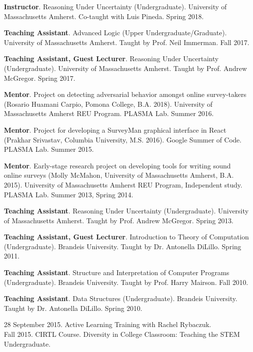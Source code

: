 \documentclass[10pt]{article}
\newcommand{\cvsec}[2]{
    \begin{tcolorbox}[width=\textwidth, breakable, title={#1}]
        #2
    \end{tcolorbox}
    \vspace{10pt}
}
\newcommand{\teaching}[6]{
  \parbox{\textwidth}{
    \textbf{#1}. #2 (#3). #4. #5. #6.
    \vspace{5pt}
  }
}
\newcommand{\umass}{University of Massachusetts Amherst}
\begin{document}
\cvsec{Teaching Experience}{
    \teaching{Instructor}
    {Reasoning Under Uncertainty}
    {Undergraduate}
    {\umass{}}{Co-taught with Luis Pineda}
    {Spring 2018}
    
    \teaching{Teaching Assistant}
    {Advanced Logic}
    {Upper Undergraduate/Graduate}
    {\umass{}}
    {Taught by Prof. Neil Immerman}
    {Fall 2017}
    
    \teaching{Teaching Assistant, Guest Lecturer}
    {Reasoning Under Uncertainty}
    {Undergraduate}
    {\umass{}}
    {Taught by Prof. Andrew McGregor}
    {Spring 2017}

    \teaching{Mentor}
    {Project on detecting adversarial behavior amongst online survey-takers}
    {Rosario Huamani Carpio, Pomona College, B.A.  2018}
    {\umass{} REU Program}
    {PLASMA Lab}
    {Summer 2016}
    
    \teaching{Mentor}
    {Project for developing a SurveyMan graphical interface in React}
    {Prakhar Srivastav, Columbia University, M.S. 2016}
    {Google Summer of Code}
    {PLASMA Lab}
    {Summer 2015}
    
    \teaching{Mentor}
    {Early-stage research project on developing tools for writing sound online surveys}
    {Molly McMahon, \umass{}, B.A. 2015}
    {\umass{} REU Program, Independent study}
    {PLASMA Lab}
    {Summer 2013, Spring 2014}
    
    \teaching{Teaching Assistant}
    {Reasoning Under Uncertainty}
    {Undergraduate}
    {\umass{}}
    {Taught by Prof. Andrew McGregor}
    {Spring 2013}
    
    \teaching{Teaching Assistant, Guest Lecturer}
    {Introduction to Theory of Computation}
    {Undergraduate}
    {Brandeis University}
    {Taught by Dr. Antonella DiLillo}
    {Spring 2011}
    
    \teaching{Teaching Assistant}
    {Structure and Interpretation of Computer Programs}
    {Undergraduate}
    {Brandeis University}
    {Taught by Prof. Harry Mairson}
    {Fall 2010}
    
    \teaching{Teaching Assistant}
    {Data Structures}
    {Undergraduate}
    {Brandeis University}
    {Taught by Dr. Antonella DiLillo}
    {Spring 2010}
  }


\cvsec{Teaching Training}{28 September 2015.  Active Learning Training with Rachel Rybaczuk.\\
Fall 2015.  CIRTL Course.  Diversity in College Classroom:  Teaching the STEM Undergraduate.
}
\end{document}
